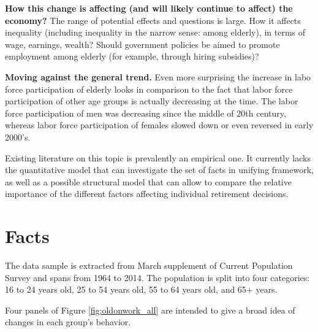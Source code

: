 \documentclass[
10pt, %
a4paper, %
oneside, %
headinclude,footinclude, %
BCOR5mm, %
]{scrartcl}
\begin{document}
\textbf{How this change is affecting (and will likely continue to affect) the economy?} The range of potential effects and questions is large. How it affects inequality (including inequality in the narrow sense: among elderly), in terms of wage, earnings, wealth? Should government policies be aimed to promote employment among elderly (for example, through hiring subsidies)? 

\textbf{Moving against the general trend.} Even more surprising the increase in labo force participation of elderly looks in comparison to the fact that labor force participation of other age groups is actually decreasing at the time. The labor force participation of men was decreasing since the  middle of 20th century, whereas labor force participation of females slowed down or even reversed in early 2000's.

Existing literature on this topic is prevalently an empirical one. It currently lacks the quantitative model that can investigate the set of facts in unifying framework, as well as a possible structural model that can allow to compare the relative importance of the different factors affecting individual retirement decisions.
 

\section{Facts}

The data sample is extracted from March supplement of Current Population Survey and spans from 1964 to 2014. The population is split into four categories: 16 to 24 years old, 25 to 54 years old, 55 to 64 years old, and 65+ years. 

Four panels of Figure \vref{fig:oldonwork_all} are intended to give a broad idea of changes in each group's behavior.
\end{document}

